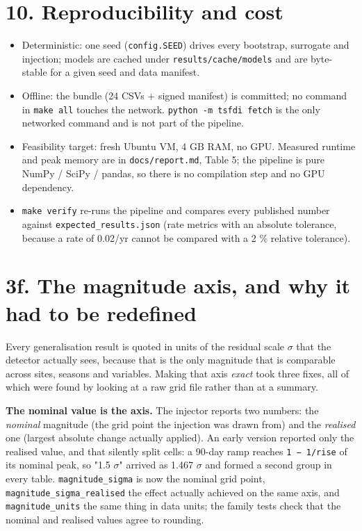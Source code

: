 \documentclass[10pt,a4paper]{article}
\begin{document}
\section*{10. Reproducibility and cost}
\begin{itemize}
\item Deterministic: one seed (\texttt{config.SEED}) drives every bootstrap, surrogate and
injection; models are cached under \texttt{results/\allowbreak{}cache/\allowbreak{}models} and are byte-\allowbreak{}stable for a given seed and data manifest.

\item Offline: the bundle (24 CSVs + signed manifest) is committed; no command in
\texttt{make all} touches the network. \texttt{python -\allowbreak{}m tsfdi fetch} is the only networked command and is not part of the pipeline.

\item Feasibility target: fresh Ubuntu VM, 4 GB RAM, no GPU. Measured runtime and
peak memory are in \texttt{docs/\allowbreak{}report.md}, Table 5; the pipeline is pure NumPy /\allowbreak{} SciPy /\allowbreak{} pandas, so there is no compilation step and no GPU dependency.

\item \texttt{make verify} re-\allowbreak{}runs the pipeline and compares every published number against
\texttt{expected\_\allowbreak{}results.json} (rate metrics with an absolute tolerance, because a rate of 0.02/\allowbreak{}yr cannot be compared with a 2 \% relative tolerance).

\end{itemize}

\section*{3f. The magnitude axis, and why it had to be redefined}
Every generalisation result is quoted in units of the residual scale $\sigma$ that the detector actually sees, because that is the only magnitude that is comparable across sites, seasons and variables. Making that axis \emph{exact} took three fixes, all of which were found by looking at a raw grid file rather than at a summary.

\textbf{The nominal value is the axis.} The injector reports two numbers: the \emph{nominal} magnitude (the grid point the injection was drawn from) and the \emph{realised} one (largest absolute change actually applied). An early version reported only the realised value, and that silently split cells: a 90-\allowbreak{}day ramp reaches \texttt{1 − 1/\allowbreak{}rise} of its nominal peak, so "1.5 $\sigma$" arrived as 1.467 $\sigma$ and formed a second group in every table. \texttt{magnitude\_\allowbreak{}sigma} is now the nominal grid point, \texttt{magnitude\_\allowbreak{}sigma\_\allowbreak{}realised} the effect actually achieved on the same axis, and \texttt{magnitude\_\allowbreak{}units} the same thing in data units; the family tests check that the nominal and realised values agree to rounding.
\end{document}
